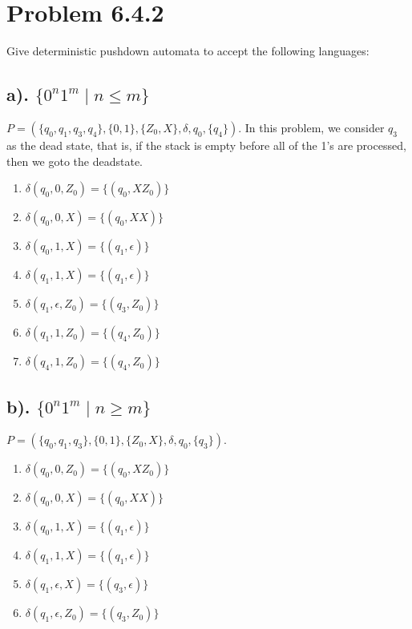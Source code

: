 \documentclass[20pt]{article} %
\begin{document}
\section{Problem 6.4.2}
Give deterministic pushdown automata to accept the following languages:
\subsection{a). $\{0^{n}1^{m} \mid n \leq m\}$}
$P = (\{q_0, q_1, q_3, q_4\}, \{0,1\}, \{Z_0, X\}, \delta, q_0, \{q_4\})$.
In this problem, we consider $q_3$ as the dead state, that is, if the stack is empty before all of the 1's are processed, then we goto the deadstate.
\begin{enumerate}
\item $\delta(q_0, 0, Z_0) = \{(q_0, XZ_0)\}$
\item $\delta(q_0, 0, X) = \{(q_0, XX)\}$
\item $\delta(q_0, 1, X) = \{(q_1, \epsilon)\}$
\item $\delta(q_1, 1, X) = \{(q_1, \epsilon)\}$
\item $\delta(q_1, \epsilon, Z_0) = \{(q_3, Z_0)\}$
\item $\delta(q_1, 1, Z_0) = \{(q_4, Z_0)\}$
\item $\delta(q_4, 1, Z_0) = \{(q_4, Z_0)\}$
\end{enumerate}
\subsection{b). $\{0^{n}1^{m} \mid n \geq m\}$}
$P = (\{q_0, q_1, q_3\}, \{0,1\}, \{Z_0, X\}, \delta, q_0, \{q_3\})$.
\begin{enumerate}
\item $\delta(q_0, 0, Z_0) = \{(q_0, XZ_0)\}$
\item $\delta(q_0, 0, X) = \{(q_0, XX)\}$
\item $\delta(q_0, 1, X) = \{(q_1, \epsilon)\}$
\item $\delta(q_1, 1, X) = \{(q_1, \epsilon)\}$
\item $\delta(q_1, \epsilon, X) = \{(q_3, \epsilon)\}$
\item $\delta(q_1, \epsilon, Z_0) = \{(q_3, Z_0)\}$
\end{enumerate}
\end{document}
